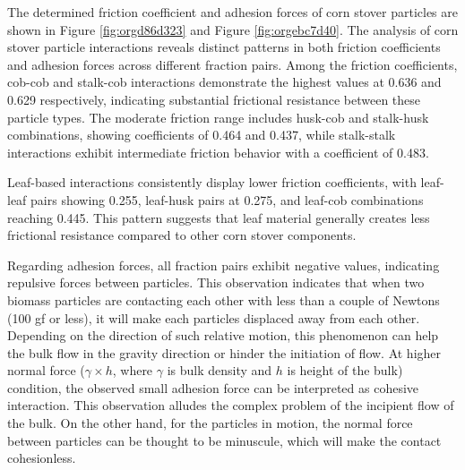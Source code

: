 \documentclass[xcolor=dvipsnames,10pt,hidelinks]{article}
\begin{document}
The determined friction coefficient and adhesion forces of corn stover particles are shown in Figure \ref{fig:orgd86d323} and Figure \ref{fig:orgebc7d40}.
The analysis of corn stover particle interactions reveals distinct patterns in both friction coefficients and adhesion forces across different fraction pairs. Among the friction coefficients, cob-cob and stalk-cob interactions demonstrate the highest values at 0.636 and 0.629 respectively, indicating substantial frictional resistance between these particle types. The moderate friction range includes husk-cob and stalk-husk combinations, showing coefficients of 0.464 and 0.437, while stalk-stalk interactions exhibit intermediate friction behavior with a coefficient of 0.483.

Leaf-based interactions consistently display lower friction coefficients, with leaf-leaf pairs showing 0.255, leaf-husk pairs at 0.275, and leaf-cob combinations reaching 0.445. This pattern suggests that leaf material generally creates less frictional resistance compared to other corn stover components.

Regarding adhesion forces, all fraction pairs exhibit negative values, indicating repulsive forces between particles.
This observation indicates that when two biomass particles are contacting each other with less than a couple of Newtons (100 gf or less),
it will make each particles displaced away from each other.
Depending on the direction of such relative motion, this phenomenon can help the bulk flow in the gravity direction or hinder the initiation of flow.
At higher normal force (\(\gamma\times h\), where \(\gamma\) is bulk density and \(h\) is height of the bulk) condition,
the observed small adhesion force can be interpreted as cohesive interaction.
This observation alludes the complex problem of the incipient flow of the bulk.
On the other hand, for the particles in motion, the normal force between particles can be thought to be minuscule, which will make the contact cohesionless.
\end{document}
